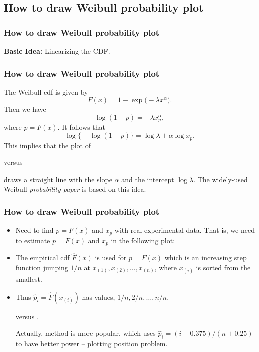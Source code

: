 \subsection{How to draw Weibull probability plot}

\begin{frame}
\frametitle{How to draw Weibull probability plot}

{\Large\bf Basic Idea:} Linearizing the CDF.

\end{frame}

\begin{frame}
\frametitle{How to draw Weibull probability plot}
The Weibull cdf is given by
$$
F(x) = 1 - \exp\big( - \lambda x^{\alpha}  \big). 
$$
Then we have
$$
\log(1-p) = -\lambda x_p^{\alpha}, 
$$
where $p=F(x)$. It follows that
$$
\log\big\{ -\log(1-p) \big\} = \log\lambda + \alpha \log x_p.
$$
This implies that the plot of  
\begin{block}{}
\begin{center}
 versus  
\end{center}
\end{block}
draws a straight line with the slope $\alpha$ and the intercept $\log\lambda$.
The widely-used Weibull \textit{probability paper}
is based on this idea.
\end{frame}



\begin{frame}
\frametitle{How to draw Weibull probability plot}
\begin{itemize}
\item Need to find $p=F(x)$ and $x_p$ with real experimental data. 
That is, we need to estimate  $p=F(x)$ and $x_p$ in the following plot:
\item The empirical cdf $\hat{F}(x)$ is used for $p=F(x)$ which is an increasing
 step function jumping $1/n$ at
$x_{(1)}, x_{(2)}, \ldots, x_{(n)}$, where $x_{(i)}$ is sorted from the smallest. 
\item Thus $\hat{p}_i=\hat{F}(x_{(i)})$ has values, $1/n, 2/n, \ldots, n/n$. 

\begin{block}{}
\begin{center}
 versus .
\end{center}
\end{block}
 Actually, \cite{Blom:1958} method is more popular, which uses 
$\hat{p}_i= (i-0.375)/(n+0.25)$ to have better power -- plotting position problem.
\end{itemize}
\end{frame}

